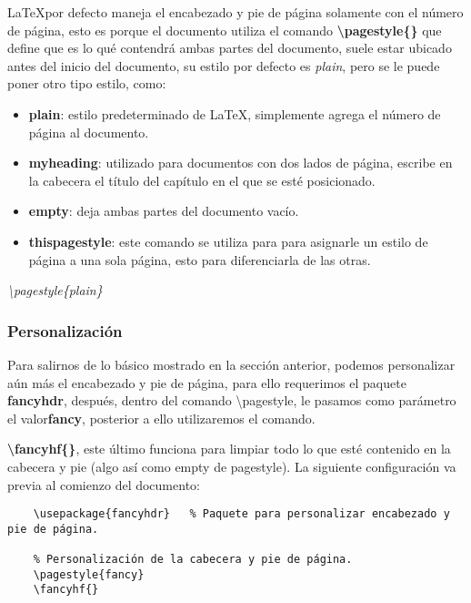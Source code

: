\LaTeX por defecto maneja el encabezado y pie de página solamente con el número de página, esto es porque el documento utiliza el comando \textbf{\textbackslash{pagestyle\{\}}} que define que es lo qué contendrá ambas partes del documento, suele estar ubicado antes del inicio del documento, su estilo por defecto es \textit{plain}, pero se le puede poner otro tipo estilo, como:
\begin{itemize}
    \item \textbf{plain}: estilo predeterminado de \LaTeX, simplemente agrega el número de página al documento.
    \item \textbf{myheading}: utilizado para documentos con dos lados de página, escribe en la cabecera el título del capítulo en el que se esté posicionado.
    \item \textbf{empty}: deja ambas partes del documento vacío.
    \item \textbf{thispagestyle}: este comando se utiliza para para asignarle un estilo de página a una sola página, esto para diferenciarla de las otras.
\end{itemize}
\begin{center}
    \textit{\textbackslash{pagestyle\{plain\}}}
\end{center}


\subsubsection{Personalización}

Para salirnos de lo básico mostrado en la sección anterior, podemos personalizar aún más el encabezado y pie de página, para ello requerimos el paquete \textbf{fancyhdr}, después, dentro del comando \textbackslash{pagestyle}, le pasamos como parámetro el valor\textbf{fancy}, posterior a ello utilizaremos el comando.

\textbf{\textbackslash{fancyhf\{\}}}, este último funciona para limpiar todo lo que esté contenido en la cabecera y pie (algo así como empty de pagestyle). La siguiente configuración va previa al comienzo del documento:
\begin{lstlisting}
    \usepackage{fancyhdr}	% Paquete para personalizar encabezado y pie de página.
    
    % Personalización de la cabecera y pie de página.
    \pagestyle{fancy}
    \fancyhf{}

    
    
    
\end{lstlisting}

